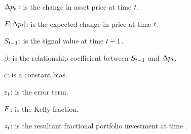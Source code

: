\documentclass{article}
\begin{document}
$\Delta p_{t}:$ is the change in asset price at time $t$.

$E[\Delta p_{t}]$: is the expected change in price at time $t$.

$S_{t-1}$: is the signal value at time $t-1$.

$\beta$: is the relationship coefficient between $S_{t-1}$ and $\Delta p_{t}$.

$c$: is a constant bias.

$\varepsilon_{t}$: is the error term.

$F$: is the Kelly fraction.

$z_{t}$: is the resultant fractional portfolio investment at time \currenttime.


\keyterms
\furtherlinks %
\end{document}
